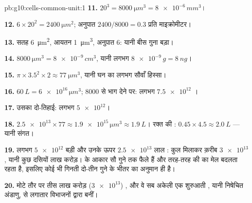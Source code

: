 \begin{solution}{pb:g10:cells-common-unit:1}
\textbf{11.} $20^3 = \qty{8000}{\micro m^3} = \num{8e-6}\,\unit{mm^3}$।

\textbf{12.} $6 \times 20^2 = \qty{2400}{\micro m^2}$; अनुपात
$2400/8000 = 0.3$ प्रति माइक्रोमीटर।

\textbf{13.} सतह \qty{6}{\micro m^2}, आयतन \qty{1}{\micro m^3},
अनुपात 6: यानी बीस गुना बड़ा।

\textbf{14.} $\qty{8000}{\micro m^3} = \num{8e-9}\,\unit{cm^3}$, यानी
लगभग $\num{8e-9}\,\unit{g} = \qty{8}{ng}$।

\textbf{15.} $\pi \times 3.5^2 \times 2 \approx \qty{77}{\micro m^3}$,
यानी घन का लगभग सौवाँ हिस्सा।

\textbf{16.} $\qty{60}{L} = \num{6e16}\,\unit{\micro m^3}$; 8000 से भाग
देने पर: लगभग $\num{7.5e12}$ ।

\textbf{17.} उसका दो-तिहाई: लगभग $\num{5e12}$।

\textbf{18.} $\num{2.5e13} \times 77 \approx \num{1.9e15}\,\unit{\micro
m^3} \approx \qty{1.9}{L}$। रक्त की : $0.45 \times 4.5 \approx
\qty{2.0}{L}$ --- यानी संगत।

\textbf{19.} लगभग $\num{5e12}$ बड़ी  और उनके ऊपर $\num{2.5e13}$
लाल : कुल मिलाकर क़रीब $\num{3e13}$, यानी कुछ दसियों लाख करोड़।
 के आकार सौ गुने तक फैले हैं और तरह-तरह की  का मेल बदलता
रहता है, इसलिए कोई भी गिनती दो-तीन गुने के भीतर का अनुमान ही है।

\textbf{20.} मोटे तौर पर तीस लाख करोड़ ($\num{3e13}$) , और वे सब
अकेली एक शुरुआती , यानी निषेचित अंडाणु, से लगातार  विभाजनों
द्वारा बनीं।
\end{solution}
